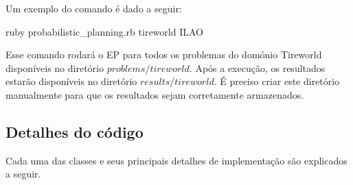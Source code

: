 \documentclass[12pt,a4paper]{article}
\begin{document}
Um exemplo do comando é dado a seguir:

\begin{center}
{ruby probabilistic\_planning.rb tireworld ILAO}
\end{center}

Esse comando rodará o EP para todos os problemas do domónio Tireworld disponíveis no diretório $problems/tireworld$. Após a execução, os resultados estarão disponíveis no diretório $results/tireworld$. É preciso criar este diretório manualmente para que os resultados sejam corretamente armazenados.



\subsection{Detalhes do código}\label{implementacao:detalhes}
Cada uma das classes e seus principais detalhes de implementação são explicados a seguir.
\end{document}
